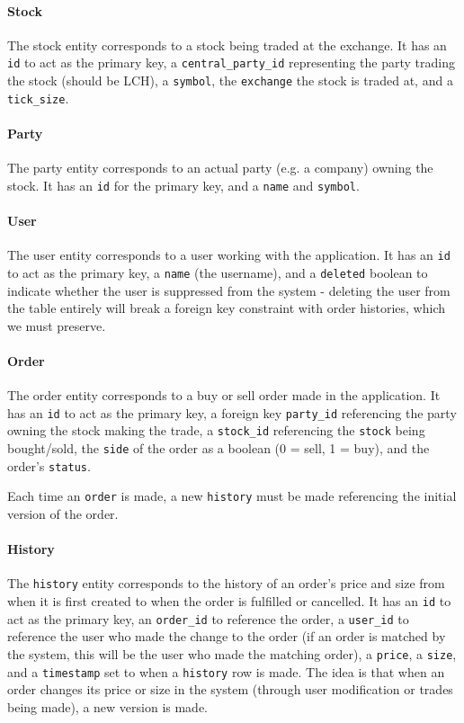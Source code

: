 \documentclass{article}
\begin{document}
\paragraph{Stock} The stock entity corresponds to a stock being traded at the exchange. It has an \texttt{id} to act as the primary key, a \texttt{central\_party\_id} representing the party trading the stock (should be LCH), a \texttt{symbol}, the \texttt{exchange} the stock is traded at, and a \texttt{tick\_size}.

\paragraph{Party} The party entity corresponds to an actual party (e.g. a company) owning the stock. It has an \texttt{id} for the primary key, and a \texttt{name} and \texttt{symbol}.

\paragraph{User} The user entity corresponds to a user working with the application. It has an \texttt{id} to act as the primary key, a \texttt{name} (the username), and a \texttt{deleted} boolean to indicate whether the user is suppressed from the system - deleting the user from the table entirely will break a foreign key constraint with order histories, which we must preserve.

\paragraph{Order} The order entity corresponds to a buy or sell order made in the application. It has an \texttt{id} to act as the primary key, a foreign key \texttt{party\_id} referencing the party owning the stock making the trade, a \texttt{stock\_id} referencing the \texttt{stock} being bought/sold, the \texttt{side} of the order as a boolean (0 = sell, 1 = buy), and the order's \texttt{status}.

Each time an \texttt{order} is made, a new \texttt{history} must be made referencing the initial version of the order.

\paragraph{History} The \texttt{history} entity corresponds to the history of an order's price and size from when it is first created to when the order is fulfilled or cancelled. It has an \texttt{id} to act as the primary key, an \texttt{order\_id} to reference the order, a \texttt{user\_id} to reference the user who made the change to the order (if an order is matched by the system, this will be the user who made the matching order), a \texttt{price}, a \texttt{size}, and a \texttt{timestamp} set to when a \texttt{history} row is made. The idea is that when an order changes its price or size in the  system (through user modification or trades being made), a new version is made.
\end{document}
